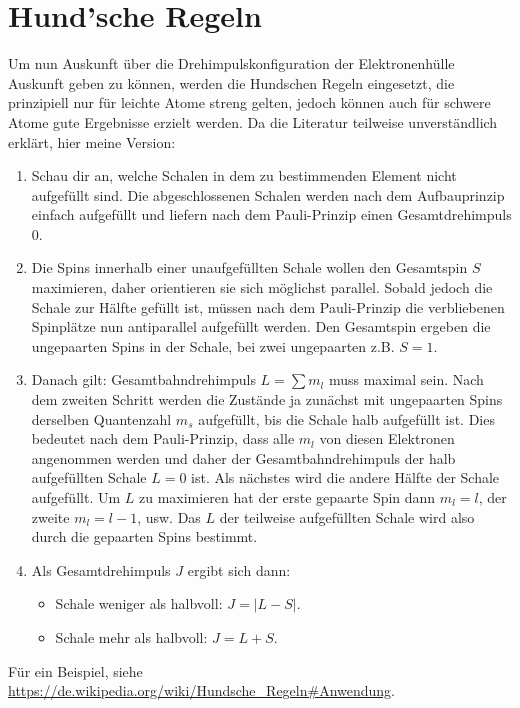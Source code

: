 \section{Hund'sche Regeln}
Um nun Auskunft über die Drehimpulskonfiguration der Elektronenhülle Auskunft geben zu können, werden die Hundschen Regeln eingesetzt, die prinzipiell nur für leichte Atome streng gelten, jedoch können auch für schwere Atome gute Ergebnisse erzielt werden.
Da die Literatur teilweise unverständlich erklärt, hier meine Version:
\begin{enumerate}
	\item Schau dir an, welche Schalen in dem zu bestimmenden Element nicht aufgefüllt sind.
	Die abgeschlossenen Schalen werden nach dem Aufbauprinzip einfach aufgefüllt und liefern nach dem Pauli-Prinzip einen Gesamtdrehimpuls 0.
	\item Die Spins innerhalb einer unaufgefüllten Schale wollen den Gesamtspin $S$ maximieren, daher orientieren sie sich möglichst parallel.
	Sobald jedoch die Schale zur Hälfte gefüllt ist, müssen nach dem Pauli-Prinzip die verbliebenen Spinplätze nun antiparallel aufgefüllt werden.
	Den Gesamtspin ergeben die ungepaarten Spins in der Schale, bei zwei ungepaarten z.B. $S=1$.
	\item Danach gilt: Gesamtbahndrehimpuls $L=\sum m_l$ muss maximal sein.
	Nach dem zweiten Schritt werden die Zustände ja zunächst mit ungepaarten Spins derselben Quantenzahl $m_s$ aufgefüllt, bis die Schale halb aufgefüllt ist.
	Dies bedeutet nach dem Pauli-Prinzip, dass alle $m_l$ von diesen Elektronen angenommen werden und daher der Gesamtbahndrehimpuls der halb aufgefüllten Schale $L=0$ ist.
	Als nächstes wird die andere Hälfte der Schale aufgefüllt. Um $L$ zu maximieren hat der erste gepaarte Spin dann $m_l=l$, der zweite $m_l=l-1$, usw.
	Das $L$ der teilweise aufgefüllten Schale wird also durch die gepaarten Spins bestimmt.
	\item Als Gesamtdrehimpuls $J$ ergibt sich dann:
	\begin{itemize}
		\item Schale weniger als halbvoll: $J=|L-S|$.
		\item Schale mehr als halbvoll: $J=L+S$.
	\end{itemize}
\end{enumerate}
Für ein Beispiel, siehe \url{https://de.wikipedia.org/wiki/Hundsche_Regeln#Anwendung}.
